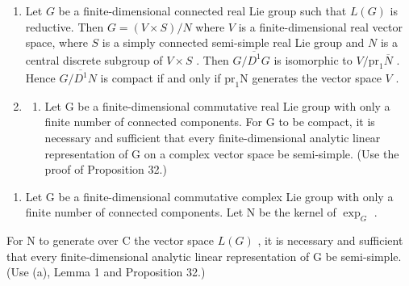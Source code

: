 \begin{enumerate}
\def\labelenumi{\arabic{enumi}.}
\setcounter{enumi}{21}
\item
  Let \(G\) be a finite-dimensional connected real Lie group such that \(L(G)\) is reductive. Then \(G = (V \times S)/N\) where \(V\) is a finite-dimensional real vector space, where \(S\) is a simply connected semi-simple real Lie group and \(N\) is a central discrete subgroup of \(V \times S\) . Then \(G/\overline{D^1}G\) is isomorphic to \(V/\mathrm{pr}_1\overline{N}\) . Hence \(G/\overline{D^1}N\) is compact if and only if \(\mathrm{pr}_1\mathrm{N}\) generates the vector space \(V\) .
\item
  \begin{enumerate}
  \def\labelenumii{(\alph{enumii})}
  \tightlist
  \item
    Let G be a finite-dimensional commutative real Lie group with only a finite number of connected components. For G to be compact, it is necessary and sufficient that every finite-dimensional analytic linear representation of G on a complex vector space be semi-simple. (Use the proof of Proposition 32.)
  \end{enumerate}
\end{enumerate}

\begin{enumerate}
\def\labelenumi{(\alph{enumi})}
\setcounter{enumi}{1}
\tightlist
\item
  Let G be a finite-dimensional commutative complex Lie group with only a finite number of connected components. Let N be the kernel of \(\exp_{G}\) .
\end{enumerate}

For N to generate over C the vector space \(L(G)\) , it is necessary and sufficient that every finite-dimensional analytic linear representation of G be semi-simple. (Use (a), Lemma 1 and Proposition 32.)

